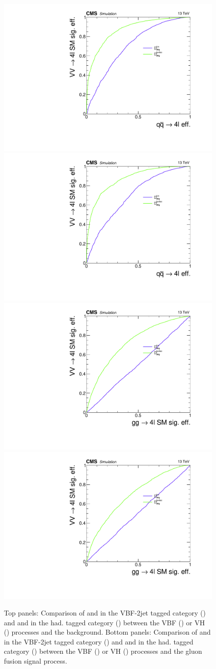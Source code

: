 \begin{figure}[tbh]
\centering
	\includegraphics[width=.4\textwidth]{Figures/Observables/ROC_VVZZ_offshell_Sig_vs_qqZZ_2e2mu_JJVBFTagged_ZZMass_105_140.pdf}
	\includegraphics[width=.4\textwidth]{Figures/Observables/ROC_VVZZ_offshell_Sig_vs_qqZZ_2e2mu_HadVHTagged_ZZMass_105_140.pdf}
	\includegraphics[width=.4\textwidth]{Figures/Observables/ROC_VVZZ_offshell_Sig_vs_ggZZ_offshell_Sig_2e2mu_JJVBFTagged_ZZMass_105_140.pdf}
	\includegraphics[width=.4\textwidth]{Figures/Observables/ROC_VVZZ_offshell_Sig_vs_ggZZ_offshell_Sig_2e2mu_HadVHTagged_ZZMass_105_140.pdf}
\caption{
Top panels: Comparison of \DbkgVBFdec and \Dbkgkin in the VBF-2jet tagged category (\cmsLeft) and 
\DbkgVHdec and \Dbkgkin in the had. \VH tagged category (\cmsRight) between the VBF (\cmsLeft) or VH (\cmsRight) processes and the \qqbar background. 
Bottom panels: Comparison of \DbkgVBFdec and \Dbkgkin in the VBF-2jet tagged category (\cmsLeft) and 
\DbkgVHdec and \Dbkgkin in the had. \VH tagged category (\cmsRight) between the VBF (\cmsLeft) or VH (\cmsRight) processes and the gluon fusion signal process.
\label{fig:rocnewDbkg}
}
\end{figure}

